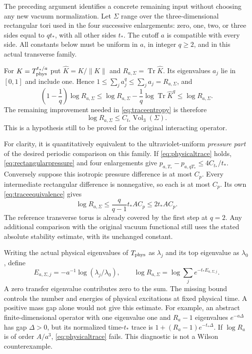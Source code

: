 \documentclass[11pt,letterpaper]{article}
\theoremstyle{plain}
\theoremstyle{remark}\newtheorem{remark}[theorem]{Scope}
\DeclareMathOperator{\Tr}{Tr}\DeclareMathOperator{\Vol}{Vol}
\begin{document}
The preceding argument identifies a concrete remaining input without choosing
any new vacuum normalization. Let $\Sigma$ range over the three-dimensional
rectangular tori used in the four successive enlargements: zero, one, two, or
three sides equal to $qt_*$, with all other sides $t_*$. The cutoff $a$ is
compatible with every side. All constants below must be uniform in $a$, in
integer $q\ge2$, and in this actual transverse family.

For $K=T_{\rm phys}^{t_*/a}$ put
$\widehat K=K/\|K\|$ and $R_{a,\Sigma}=\Tr\widehat K$. Its eigenvalues
$a_j$ lie in $[0,1]$ and include one. Hence
$1\le\sum_j a_j^q\le\sum_j a_j=R_{a,\Sigma}$, and
\begin{equation}
\left(1-\frac1q\right)\log R_{a,\Sigma}
\le\log R_{a,\Sigma}-\frac1q\log\Tr\widehat K^q
\le\log R_{a,\Sigma}.
\label{eq:traceequivalence}
\end{equation}
The remaining improvement needed in \eqref{eq:traceentropy} is therefore
\begin{equation}
\boxed{\log R_{a,\Sigma}\le C_{t_*}\Vol_3(\Sigma).}
\label{eq:physicaltrace}
\end{equation}
This is a hypothesis still to be proved for the original interacting operator.

For clarity, it is quantitatively equivalent to the ultraviolet-uniform
\emph{pressure part} of the desired periodic comparison on this family.
If \eqref{eq:physicaltrace} holds, \eqref{eq:rectangularpressure} and four
enlargements give $p_{a,T_*}-p_{a,qT_*}\le4C_{t_*}/t_*$.
Conversely suppose this isotropic pressure difference is at most $C_p$.
Every intermediate rectangular difference is nonnegative, so each is at most
$C_p$. Its own \eqref{eq:traceequivalence} gives
\[
\log R_{a,\Sigma}\le\frac q{q-1}t_*A C_p\le2t_*A C_p.
\]
The reference transverse torus is already covered by the first step at $q=2$.
Any additional comparison with the original vacuum functional still uses the
stated absolute stability estimate, with its unchanged constant.

Writing the actual physical eigenvalues of $T_{\rm phys}$ as $\lambda_j$ and
its top eigenvalue as $\lambda_0$, define
\begin{equation}
E_{a,\Sigma,j}=-a^{-1}\log(\lambda_j/\lambda_0),\qquad
\log R_{a,\Sigma}=\log\sum_j e^{-t_*E_{a,\Sigma,j}}.
\label{eq:excitationcount}
\end{equation}
A zero transfer eigenvalue contributes zero to the sum. The missing bound
controls the number and energies of physical excitations at fixed physical time.
A positive mass gap alone would not give this estimate. For example, an
abstract finite-dimensional operator with one eigenvalue one and $R_a-1$
eigenvalues $e^{-a\Delta}$ has gap $\Delta>0$, but its normalized time-$t_*$
trace is $1+(R_a-1)e^{-t_*\Delta}$. If $\log R_a$ is of order $A/a^3$,
\eqref{eq:physicaltrace} fails. This diagnostic is not a Wilson counterexample.
\end{document}
